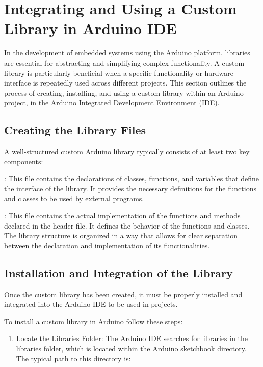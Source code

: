 {
\section{Integrating and Using a Custom Library in Arduino IDE}

In the development of embedded systems using the Arduino platform, libraries are essential for abstracting and simplifying complex functionality. A custom library is particularly beneficial when a specific functionality or hardware interface is repeatedly used across different projects. This section outlines the process of creating, installing, and using a custom library within an Arduino project, in the Arduino Integrated Development Environment (IDE).


\subsection{Creating the Library Files} 


	


A well-structured custom Arduino library typically consists of at least two key components:

	: This file contains the declarations of classes, functions, and variables that define the interface of the library. 
		It provides the necessary definitions for the functions and classes to be used by external programs.
		
		
	: This file contains the actual implementation of the functions and methods declared in the header file. 
		It defines the behavior of the functions and 	classes.
		The library structure is organized in a way that allows for clear separation between the declaration and implementation of its functionalities.






\subsection{Installation and Integration of the Library}

Once the custom library has been created, it must be properly installed and integrated into the Arduino IDE to be used in projects.

To install a custom library in Arduino follow these steps:

\begin{enumerate}
	\item Locate the Libraries Folder: The Arduino IDE searches for libraries in the libraries folder, which is located within the Arduino sketchbook directory. The typical path to this directory is:
	

\end{enumerate}}
